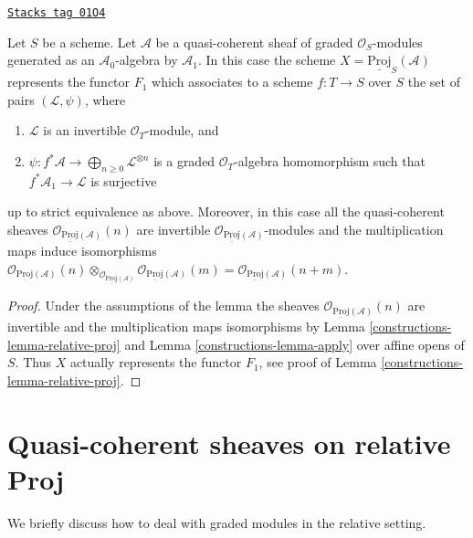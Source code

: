 \begin{lemma}
\label{constructions-lemma-apply-relative}
\href{https://stacks.math.columbia.edu/tag/01O4}{\texttt{Stacks tag 01O4}}

Let $S$ be a scheme.
Let $\mathcal{A}$ be a quasi-coherent sheaf of graded $\mathcal{O}_S$-modules
generated as an $\mathcal{A}_0$-algebra by $\mathcal{A}_1$.
In this case the scheme $X = \underline{\text{Proj}}_S(\mathcal{A})$
represents the functor $F_1$ which associates to a scheme
$f : T \to S$ over $S$ the set of pairs $(\mathcal{L}, \psi)$, where
\begin{enumerate}
\item $\mathcal{L}$ is an invertible $\mathcal{O}_T$-module, and
\item $\psi : f^*\mathcal{A} \to \bigoplus_{n \geq 0} \mathcal{L}^{\otimes n}$
is a graded $\mathcal{O}_T$-algebra homomorphism such that
$f^*\mathcal{A}_1 \to \mathcal{L}$ is surjective
\end{enumerate}
up to strict equivalence as above. Moreover, in this case all the
quasi-coherent sheaves
$\mathcal{O}_{\underline{\text{Proj}}(\mathcal{A})}(n)$
are invertible
$\mathcal{O}_{\underline{\text{Proj}}(\mathcal{A})}$-modules
and the multiplication maps induce isomorphisms
$
\mathcal{O}_{\underline{\text{Proj}}(\mathcal{A})}(n)
\otimes_{\mathcal{O}_{\underline{\text{Proj}}(\mathcal{A})}}
\mathcal{O}_{\underline{\text{Proj}}(\mathcal{A})}(m) =
\mathcal{O}_{\underline{\text{Proj}}(\mathcal{A})}(n + m)$.
\end{lemma}

\begin{proof}

Under the assumptions of the lemma the sheaves
$\mathcal{O}_{\underline{\text{Proj}}(\mathcal{A})}(n)$
are invertible and the multiplication maps isomorphisms
by Lemma \ref{constructions-lemma-relative-proj} and
Lemma \ref{constructions-lemma-apply}
over affine opens of $S$. Thus $X$ actually represents the
functor $F_1$, see proof of Lemma \ref{constructions-lemma-relative-proj}.
\end{proof}

\section{Quasi-coherent sheaves on relative Proj}
\label{constructions-section-quasi-coherent-relative-proj}
We briefly discuss how to deal with graded modules in the relative
setting.

